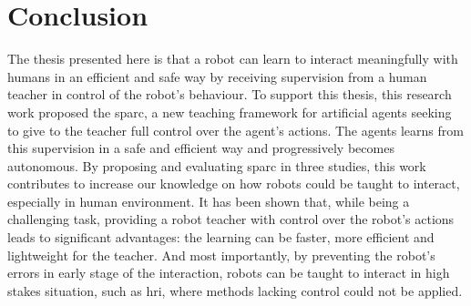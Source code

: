 \section{Conclusion}\label{sec:conc_conc}

The thesis presented here is that a robot can learn to interact meaningfully with humans in an efficient and safe way by receiving supervision from a human teacher in control of the robot's behaviour. 
%
%
To support this thesis, this research work proposed the \acrfull{sparc}, a new teaching framework for artificial agents seeking to give to the teacher full control over the agent's actions. The agents learns from this supervision in a safe and efficient way and progressively becomes autonomous. By proposing and evaluating \gls{sparc} in three studies, this work contributes to increase our knowledge on how robots could be taught to interact, especially in human environment. It has been shown that, while being a challenging task, providing a robot teacher with control over the robot's actions leads to significant advantages: the learning can be faster, more efficient and lightweight for the teacher. And most importantly, by preventing the robot's errors in early stage of the interaction, robots can be taught to interact in high stakes situation, such as \gls{hri}, where methods lacking control could not be applied.

